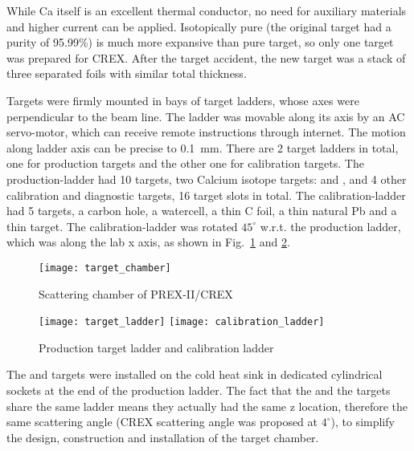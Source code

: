 While Ca itself is an excellent thermal conductor, no need for auxiliary 
materials and higher current can be applied. Isotopically pure \Ca (the original
target had a purity of 95.99\%) is much more 
expansive than pure \Pb target, so only one \Ca target was prepared for CREX. 
After the target accident, 
the new \Ca target was a stack of three separated foils with similar total thickness.

Targets were firmly mounted in bays of target ladders, whose axes were 
perpendicular to the beam line. The ladder was movable along its axis by an 
AC servo-motor, which can receive remote instructions through internet. 
The motion along ladder axis can be precise to 0.1~mm.
There are 2 target ladders in total, one for production targets and the other
one for calibration targets. The production-ladder had 10 \Pb targets, 
two Calcium isotope targets: \ca and \Ca, and 4 other calibration and diagnostic
targets, 16 target slots in total. The calibration-ladder had 5 targets, a carbon 
hole, a watercell, a thin C foil, a thin natural Pb and a thin \ca target.
The calibration-ladder was rotated $45^\circ$ w.r.t. the production ladder, 
which was along the lab x axis, as shown in Fig.~\ref{fig:scattering_chamber}
and \ref{fig:target_ladder}.

\begin{figure}[h!]
    \centering
    \texttt{[image: target\_chamber]}
    \caption{Scattering chamber of PREX-II/CREX}
    \label{fig:scattering_chamber}
\end{figure}
\begin{figure}[h!]
    \centering
    \texttt{[image: target\_ladder]}
    \texttt{[image: calibration\_ladder]}
    \caption{Production target ladder and calibration ladder}
    \label{fig:target_ladder}
\end{figure}

The \ca and \Ca targets were installed on the cold heat sink in dedicated cylindrical 
sockets at the end of the production ladder. %
The fact that the \Ca and the \Pb 
targets share the same ladder means they actually had the same z location,
therefore the same scattering angle (CREX scattering angle was proposed at $4^\circ$), 
to simplify the design, construction and installation of the target chamber.

